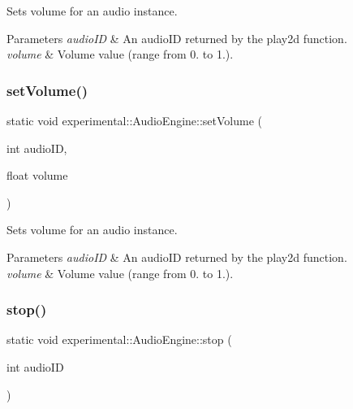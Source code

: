 Sets volume for an audio instance.


\begin{DoxyParams}{Parameters}
{\em audio\+ID} & An audio\+ID returned by the play2d function. \\
\hline
{\em volume} & Volume value (range from 0. to 1.). \\
\hline
\end{DoxyParams}
\mbox{\label{classexperimental_1_1AudioEngine_a6759e7f6b0e2da64523949cf361a083e}} 
\subsubsection{\texorpdfstring{set\+Volume()}{setVolume()}\hspace{0.1cm}{\footnotesize\ttfamily [2/2]}}
{\footnotesize\ttfamily static void experimental\+::\+Audio\+Engine\+::set\+Volume (\begin{DoxyParamCaption}\item[{int}]{audio\+ID,  }\item[{float}]{volume }\end{DoxyParamCaption})\hspace{0.3cm}{\ttfamily [static]}}

Sets volume for an audio instance.


\begin{DoxyParams}{Parameters}
{\em audio\+ID} & An audio\+ID returned by the play2d function. \\
\hline
{\em volume} & Volume value (range from 0. to 1.). \\
\hline
\end{DoxyParams}
\mbox{\label{classexperimental_1_1AudioEngine_a932422ecf6818ac5e81e4530e556fd1e}} 
\subsubsection{\texorpdfstring{stop()}{stop()}\hspace{0.1cm}{\footnotesize\ttfamily [1/2]}}
{\footnotesize\ttfamily static void experimental\+::\+Audio\+Engine\+::stop (\begin{DoxyParamCaption}\item[{int}]{audio\+ID }\end{DoxyParamCaption})\hspace{0.3cm}{\ttfamily [static]}}


